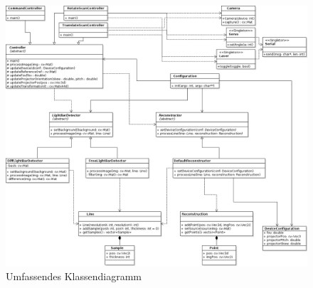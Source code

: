 \documentclass[ngerman,a4paper,parskip=half]{scrartcl}
\begin{document}

\begin{figure}[p]
	\centering
	\includegraphics[width=\linewidth]{includes/classdiagram}
	\caption{Umfassendes Klassendiagramm}
	\label{fig:classes_all}
\end{figure}
	
\end{document}

